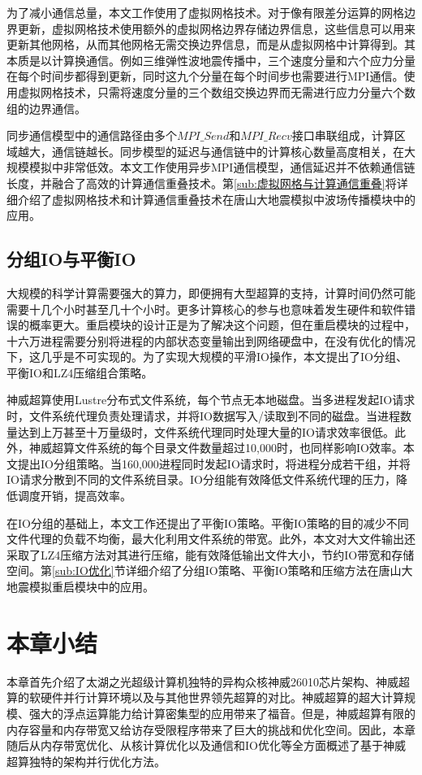 \documentclass[degree=doctor]{thuthesis}
\begin{document}
为了减小通信总量，本文工作使用了虚拟网格技术。对于像有限差分运算的网格边界更新，虚拟网格技术使用额外的虚拟网格边界存储边界信息，这些信息可以用来更新其他网格，从而其他网格无需交换边界信息，而是从虚拟网格中计算得到。其本质是以计算换通信。例如三维弹性波地震传播中，三个速度分量和六个应力分量在每个时间步都得到更新，同时这九个分量在每个时间步也需要进行MPI通信。使用虚拟网格技术，只需将速度分量的三个数组交换边界而无需进行应力分量六个数组的边界通信。

同步通信模型中的通信路径由多个$MPI\_Send$和$MPI\_Recv$接口串联组成，计算区域越大，通信链越长。同步模型的延迟与通信链中的计算核心数量高度相关，在大规模模拟中非常低效。本文工作使用异步MPI通信模型，通信延迟并不依赖通信链长度，并融合了高效的计算通信重叠技术。第\ref{sub:虚拟网格与计算通信重叠}将详细介绍了虚拟网格技术和计算通信重叠技术在唐山大地震模拟中波场传播模块中的应用。

\subsection{分组IO与平衡IO}
大规模的科学计算需要强大的算力，即便拥有大型超算的支持，计算时间仍然可能需要十几个小时甚至几十个小时。更多计算核心的参与也意味着发生硬件和软件错误的概率更大。重启模块的设计正是为了解决这个问题，但在重启模块的过程中，十六万进程需要分别将进程的内部状态变量输出到网络硬盘中，在没有优化的情况下，这几乎是不可实现的。为了实现大规模的平滑IO操作，本文提出了IO分组、平衡IO和LZ4压缩组合策略。

神威超算使用Lustre分布式文件系统，每个节点无本地磁盘。当多进程发起IO请求时，文件系统代理负责处理请求，并将IO数据写入/读取到不同的磁盘。当进程数量达到上万甚至十万量级时，文件系统代理同时处理大量的IO请求效率很低。此外，神威超算文件系统的每个目录文件数量超过10,000时，也同样影响IO效率。本文提出IO分组策略。当160,000进程同时发起IO请求时，将进程分成若干组，并将IO请求分散到不同的文件系统目录。IO分组能有效降低文件系统代理的压力，降低调度开销，提高效率。

在IO分组的基础上，本文工作还提出了平衡IO策略。平衡IO策略的目的减少不同文件代理的负载不均衡，最大化利用文件系统的带宽。此外，本文对大文件输出还采取了LZ4压缩方法对其进行压缩，能有效降低输出文件大小，节约IO带宽和存储空间。第\ref{sub:IO优化}节详细介绍了分组IO策略、平衡IO策略和压缩方法在唐山大地震模拟重启模块中的应用。

\section{本章小结}
本章首先介绍了太湖之光超级计算机独特的异构众核神威26010芯片架构、神威超算的软硬件并行计算环境以及与其他世界领先超算的对比。神威超算的超大计算规模、强大的浮点运算能力给计算密集型的应用带来了福音。但是，神威超算有限的内存容量和内存带宽又给访存受限程序带来了巨大的挑战和优化空间。因此，本章随后从内存带宽优化、从核计算优化以及通信和IO优化等全方面概述了基于神威超算独特的架构并行优化方法。
\end{document}

